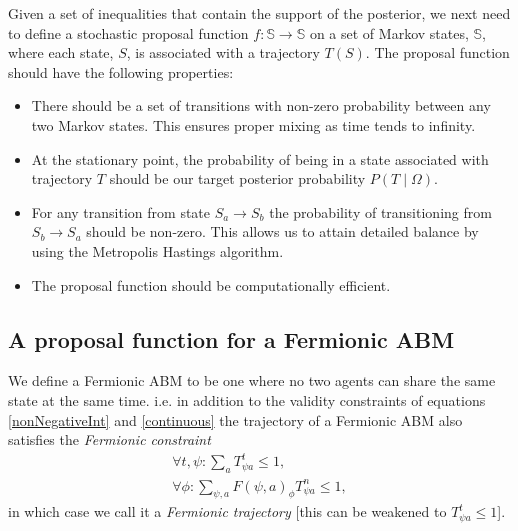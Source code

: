 Given a set of inequalities that contain the support of the posterior, we next need to define a stochastic proposal function $f:\mathbb{S} \to \mathbb{S}$ on a set of Markov states, $\mathbb{S}$, where each state, $S$, is associated with a trajectory $T(S)$. The proposal function should have the following properties:
\begin{itemize}
\item There should be a set of transitions with non-zero probability between any two Markov states. This ensures proper mixing as time tends to infinity.

\item At the stationary point, the probability of being in a state associated with trajectory $T$ should be our target posterior probability $P(T \mid \Omega)$.

\item For any transition from state $S_a \to S_b$ the probability of transitioning from $S_b \to S_a$ should be non-zero. This allows us to attain detailed balance by using the Metropolis Hastings algorithm.

\item The proposal function should be computationally efficient. 
\end{itemize}

\subsection{A proposal function for a Fermionic ABM}
\label{Fermionic}

We define a Fermionic ABM to be one where no two agents can share the same state at the same time. i.e. in addition to the validity constraints of equations \ref{nonNegativeInt} and \ref{continuous} the trajectory of a Fermionic ABM also satisfies the \textit{Fermionic constraint}
\begin{equation}
\begin{split}
\forall t,\psi: \sum_a T^t_{\psi a} \le 1, \\
\forall \phi: \sum_{\psi, a} F(\psi, a)_\phi T^n_{\psi a} \le 1,
\end{split}
\label{fermionic}
\end{equation}
in which case we call it a \textit{Fermionic trajectory} [this can be weakened to $T^t_{\psi a} \le 1$].


